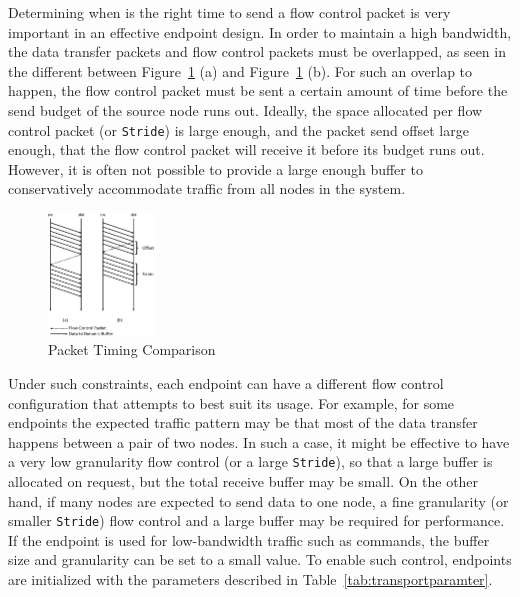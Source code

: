 Determining when is the right time to send a flow control packet is very
important in an effective endpoint design.
In order to maintain a high bandwidth, the data
transfer packets and flow control packets must be overlapped, as seen in the
different between Figure~\ref{fig:packettiming} (a) and
Figure~\ref{fig:packettiming} (b). For such an overlap to happen, the flow
control packet must be sent a certain amount of time before the send budget of
the source node runs out. Ideally, the space allocated per flow control packet
(or \texttt{Stride})
is large enough, and the packet send offset large enough, that the flow control
packet will receive it before its budget runs out. However, it is often not
possible to provide a large enough buffer to conservatively accommodate traffic
from all nodes in the system.

\begin{figure}[h]
	\begin{center}
	\includegraphics[width=0.25\textwidth]{resources/packettiming-crop.pdf}
	\caption{Packet Timing Comparison}
	\label{fig:packettiming}
	\end{center}
\end{figure}

Under such constraints, each endpoint can have a different flow control
configuration that attempts to best suit its usage. For example, for some endpoints
the expected traffic pattern may be that most of the data transfer happens
between a pair of two nodes. In such a case, it might be effective to have a
very low granularity flow control (or a large \texttt{Stride}), so that a large
buffer is allocated on request, but the total receive buffer may be small. On
the other hand, if many nodes are expected to send data to one node, a fine
granularity (or smaller \texttt{Stride}) flow control and a large buffer may be
required for performance. If the endpoint is used for low-bandwidth traffic such
as commands, the buffer size and granularity can be set to a small value.  To
enable such control, endpoints are initialized with the parameters described in
Table~\ref{tab:transportparamter}.

